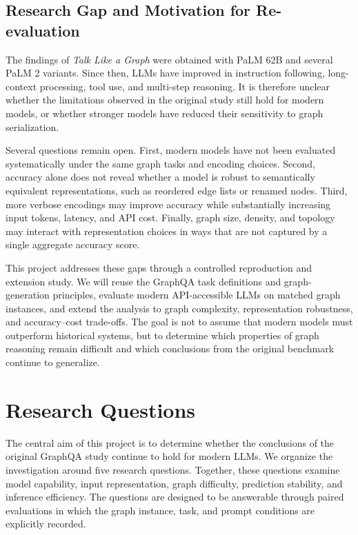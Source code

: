 \documentclass[11pt,a4paper]{article}
\begin{document}
\subsection{Research Gap and Motivation for Re-evaluation}

The findings of \emph{Talk Like a Graph} were obtained with PaLM 62B and several PaLM 2 variants. Since then, LLMs have improved in instruction following, long-context processing, tool use, and multi-step reasoning. It is therefore unclear whether the limitations observed in the original study still hold for modern models, or whether stronger models have reduced their sensitivity to graph serialization.

Several questions remain open. First, modern models have not been evaluated systematically under the same graph tasks and encoding choices. Second, accuracy alone does not reveal whether a model is robust to semantically equivalent representations, such as reordered edge lists or renamed nodes. Third, more verbose encodings may improve accuracy while substantially increasing input tokens, latency, and API cost. Finally, graph size, density, and topology may interact with representation choices in ways that are not captured by a single aggregate accuracy score.

This project addresses these gaps through a controlled reproduction and extension study. We will reuse the GraphQA task definitions and graph-generation principles, evaluate modern API-accessible LLMs on matched graph instances, and extend the analysis to graph complexity, representation robustness, and accuracy–cost trade-offs. The goal is not to assume that modern models must outperform historical systems, but to determine which properties of graph reasoning remain difficult and which conclusions from the original benchmark continue to generalize.

\section{Research Questions}

The central aim of this project is to determine whether the conclusions of the original GraphQA study continue to hold for modern LLMs. We organize the investigation around five research questions. Together, these questions examine model capability, input representation, graph difficulty, prediction stability, and inference efficiency. The questions are designed to be answerable through paired evaluations in which the graph instance, task, and prompt conditions are explicitly recorded.
\end{document}
